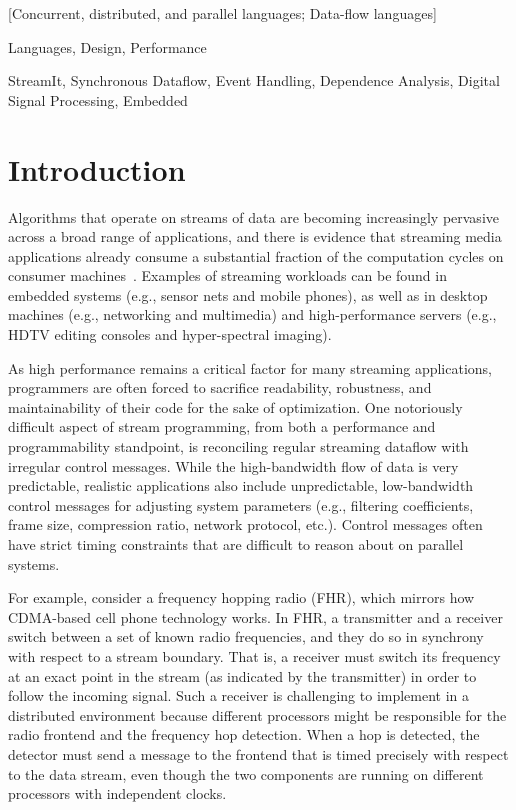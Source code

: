 \documentclass{sig-alternate}
\begin{document}
[Concurrent, distributed, and parallel languages; Data-flow languages]

\begin{terms}
Languages, Design, Performance
\end{terms}

\begin{keywords}
StreamIt, Synchronous Dataflow, Event Handling, Dependence Analysis,
Digital Signal Processing, Embedded
\end{keywords}
\section{Introduction}

Algorithms that operate on streams of data are becoming increasingly
pervasive across a broad range of applications, and there is evidence
that streaming media applications already consume a substantial
fraction of the computation cycles on consumer
machines~\cite{conte97,dief97,kirkpatrick97,Rix98}.  Examples of
streaming workloads can be found in embedded systems (e.g., sensor
nets and mobile phones), as well as in desktop machines (e.g.,
networking and multimedia) and high-performance servers (e.g., HDTV
editing consoles and hyper-spectral imaging).

As high performance remains a critical factor for many streaming
applications, programmers are often forced to sacrifice readability,
robustness, and maintainability of their code for the sake of
optimization.  One notoriously difficult aspect of stream programming,
from both a performance and programmability standpoint, is reconciling
regular streaming dataflow with irregular control messages.  While the
high-bandwidth flow of data is very predictable, realistic
applications also include unpredictable, low-bandwidth control
messages for adjusting system parameters (e.g., filtering
coefficients, frame size, compression ratio, network protocol, etc.).
Control messages often have strict timing constraints that are
difficult to reason about on parallel systems.

For example, consider a frequency hopping radio (FHR), which mirrors
how CDMA-based cell phone technology works.  In FHR, a transmitter and
a receiver switch between a set of known radio frequencies, and they
do so in synchrony with respect to a stream boundary. That is, a
receiver must switch its frequency at an exact point in the stream (as
indicated by the transmitter) in order to follow the incoming signal.
Such a receiver is challenging to implement in a distributed
environment because different processors might be responsible for the
radio frontend and the frequency hop detection.  When a hop is
detected, the detector must send a message to the frontend that is
timed precisely with respect to the data stream, even though the two
components are running on different processors with independent
clocks.
\end{document}
